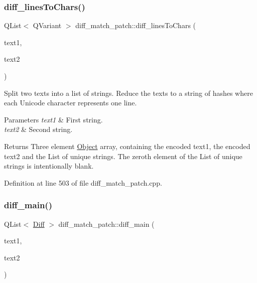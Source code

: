 \subsubsection{\texorpdfstring{diff\+\_\+lines\+To\+Chars()}{diff\_linesToChars()}}
{\footnotesize\ttfamily Q\+List$<$ Q\+Variant $>$ diff\+\_\+match\+\_\+patch\+::diff\+\_\+lines\+To\+Chars (\begin{DoxyParamCaption}\item[{const Q\+String \&}]{text1,  }\item[{const Q\+String \&}]{text2 }\end{DoxyParamCaption})\hspace{0.3cm}{\ttfamily [protected]}}

Split two texts into a list of strings. Reduce the texts to a string of hashes where each Unicode character represents one line. 
\begin{DoxyParams}{Parameters}
{\em text1} & First string. \\
\hline
{\em text2} & Second string. \\
\hline
\end{DoxyParams}
\begin{DoxyReturn}{Returns}
Three element \hyperlink{class_object}{Object} array, containing the encoded text1, the encoded text2 and the List of unique strings. The zeroth element of the List of unique strings is intentionally blank. 
\end{DoxyReturn}


Definition at line 503 of file diff\+\_\+match\+\_\+patch.\+cpp.

\mbox{\label{classdiff__match__patch_a82fe78383b2fddf542fe83e057252e53}} 
\subsubsection{\texorpdfstring{diff\+\_\+main()}{diff\_main()}\hspace{0.1cm}{\footnotesize\ttfamily [1/2]}}
{\footnotesize\ttfamily Q\+List$<$ \hyperlink{class_diff}{Diff} $>$ diff\+\_\+match\+\_\+patch\+::diff\+\_\+main (\begin{DoxyParamCaption}\item[{const Q\+String \&}]{text1,  }\item[{const Q\+String \&}]{text2 }\end{DoxyParamCaption})}

